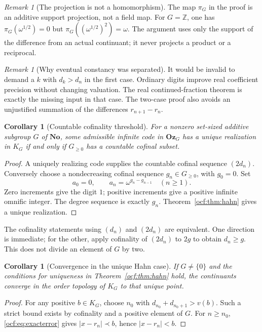\documentclass[11pt,a4paper]{article}
\numberwithin{equation}{section}
\newtheorem{corollary}[theorem]{Corollary}
\theoremstyle{definition}
\theoremstyle{remark}
\newtheorem{remark}[theorem]{Remark}
\newcommand{\No}{\mathbf{No}}
\newcommand{\Oz}{\mathbf{Oz}}
\newcommand{\Z}{\mathbb Z}
\begin{document}
\begin{remark}[The projection is not a homomorphism]\label{ocf:rem:projection}
The map $\pi_G$ in the proof is an additive support projection, not a field
map. For $G=\Z$, one has
$\pi_G(\omega^{1/2})=0$ but $\pi_G((\omega^{1/2})^2)=\omega$.
The argument uses only the support of the difference from an actual
continuant; it never projects a product or a reciprocal.
\end{remark}

\begin{remark}[Why eventual constancy was separated]\label{ocf:rem:twocases}
It would be invalid to demand a $k$ with $d_k>d_n$ in the first case.
Ordinary digits improve real coefficient precision without changing
valuation. The real continued-fraction theorem is exactly the missing
input in that case. The two-case proof also avoids an unjustified
summation of the differences $r_{n+1}-r_n$.
\end{remark}

\begin{corollary}[Countable cofinality threshold]\label{ocf:cor:cofinality}
For a nonzero set-sized additive subgroup $G$ of $\No$, some admissible
infinite code in $\Oz_G$ has a unique realization in $K_G$ if and only if
$G_{\ge0}$ has a countable cofinal subset.
\end{corollary}
\begin{proof}
A uniquely realizing code supplies the countable cofinal sequence $(2d_n)$.
Conversely choose a nondecreasing cofinal sequence $g_n\in G_{\ge0}$,
with $g_0=0$. Set
\[
 a_0=0,\qquad a_n=\omega^{g_n-g_{n-1}}\quad(n\ge1).
\]
Zero increments give the digit $1$; positive increments give a positive
infinite omnific integer. The degree sequence is exactly $g_n$.
Theorem~\ref{ocf:thm:hahn} gives a unique realization.
\end{proof}

The cofinality statements using $(d_n)$ and $(2d_n)$ are equivalent. One
direction is immediate; for the other, apply cofinality of $(2d_n)$ to
$2g$ to obtain $d_n\ge g$. This does not divide an element of $G$ by two.

\begin{corollary}[Convergence in the unique Hahn case]\label{ocf:cor:convergence}
If $G\ne\{0\}$ and the conditions for uniqueness in
Theorem~\ref{ocf:thm:hahn} hold, the continuants converge in the order topology
of $K_G$ to that unique point.
\end{corollary}
\begin{proof}
For any positive $b\in K_G$, choose $n_0$ with
$d_{n_0}+d_{n_0+1}>v(b)$. Such a strict bound exists by cofinality and a
positive element of $G$. For $n\ge n_0$, \eqref{ocf:eq:exacterror} gives
$|x-r_n|\prec b$, hence $|x-r_n|<b$.
\end{proof}
\end{document}
